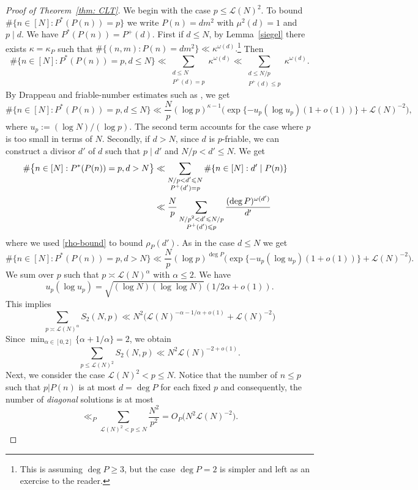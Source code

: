 \documentclass[reqno, 12pt]{amsart}
\theoremstyle{plain}
\theoremstyle{definition}
\theoremstyle{remark}
\newcommand{\LL}{\mathcal L}
\renewcommand{\le}{\leqslant}
\renewcommand{\ge}{\geqslant}
\renewcommand{\leq}{\leqslant}
\begin{document}
\begin{proof}[Proof of Theorem~\ref{thm: CLT}]
We begin with the case $p \le  \LL(N)^2$.
To bound $\# \big\{ n \in [N] :  P^{*}(P(n )) = p\big\}$
we write $P(n)=dm^2$ with $\mu^2(d)=1$ and $p\mid d.$ We have 
$P^{*}(P(n))=P^{+}(d).$
First if $d\leq N$, by Lemma~\ref{siegel} there exists $\kappa=\kappa_P$ such that 
$\#\{ (n,m):P(n)=dm^2\}\ll \kappa^{\omega(d)}.$\footnote{This is assuming $\deg P\ge 3$, but the case $\deg P=2$ is simpler and left as an exercise to the reader.}
Then
$$\# \big\{ n \in [N] :  P^{*}(P(n )) = p, d\leq N\big\}
\ll \sum_{\substack{d\leq N\\ P^+(d)=p}}\kappa^{\omega(d)}
\ll   \sum_{\substack{d\leq N/p\\ P^+(d)\leq p}}\kappa^{\omega(d)}.$$
By  Drappeau \cite[Theorem~1]{D16}
and friable-number estimates such as \cite[(1.12)]{Granville},
we get
$$\# \big\{ n \in [N] :  P^{*}(P(n )) = p, d\leq N\big\}
\ll \frac{N}{p}(\log p)^{\kappa-1} \big( \exp\{ -u_p (\log u_p)(1+o(1))\}+\LL(N)^{-2}\big),$$
where $u_p:=(\log N)/(\log p).$ The second term accounts for the case where $p$ is too small in terms of $N$.
Secondly, if $d>N$, since $d$ is $p$-friable, we can construct a divisor $d'$ of $d$ such that $p\mid d'$ and $N/p<d'\leq N$. 
We get
\begin{align*}
    \# \big\{ n \in [N] :  P^{*}(P(n )) = p, d> N\big\}&\ll \sum_{\substack{N/p<d'\leq N\\ P^+(d')=p}}\#\{ n\in [N]: d'\mid P(n)\}
\cr&\ll\frac{N}{p} \sum_{\substack{N/p^2<d'\leq N/p\\ P^+(d')\leq p}}\frac{(\deg P)^{\omega(d') }}{d'}\end{align*}
where we used \eqref{rho-bound} to bound $\rho_P(d').$
As in the case $d\leq N$ we get
$$ \# \big\{ n \in [N] :  P^{*}(P(n )) = p, d> N\big\}
\ll \frac{N}{p}(\log p)^{\deg P} \big( \exp\{ -u_p (\log u_p)(1+o(1))\}+\LL(N)^{-2}\big).$$
We sum over $p$ such that $p\asymp \LL(N)^{\alpha} $ with $\alpha \leq 2.$ We have 
$$u_p (\log u_p)=\sqrt{ (\log N)(\log\log N)}(1/2\alpha+o(1)).$$
This implies
$$\sum_{p\asymp \LL(N)^{\alpha}}
S_2(N,p)\ll N^2\big( \LL(N)^{-\alpha-1/\alpha+o(1)}+ \LL(N)^{-2}\big)$$
Since $\min_{\alpha\in [0,2]} \{ \alpha+1/\alpha\}=2$, we obtain
$$\sum_{p\leq \LL(N)^{2}}
S_2(N,p)\ll N^2\LL(N)^{-2+o(1)}
.$$
Next, we consider the case $ \LL(N)^2 < p \le N$. Notice that the number of $n\le p$ such that $p|P(n)$ is at most $d=\deg P$ for each fixed $p$ and consequently, the number of {\it diagonal} solutions is at most 
\[\ll_P  \sum_{\LL(N)^2< p \le N}  \frac{N^{2}}{p^{2}}   = O_P\big(N^{2}\LL(N)^{-2}\big). \]

\end{proof}
\end{document}
